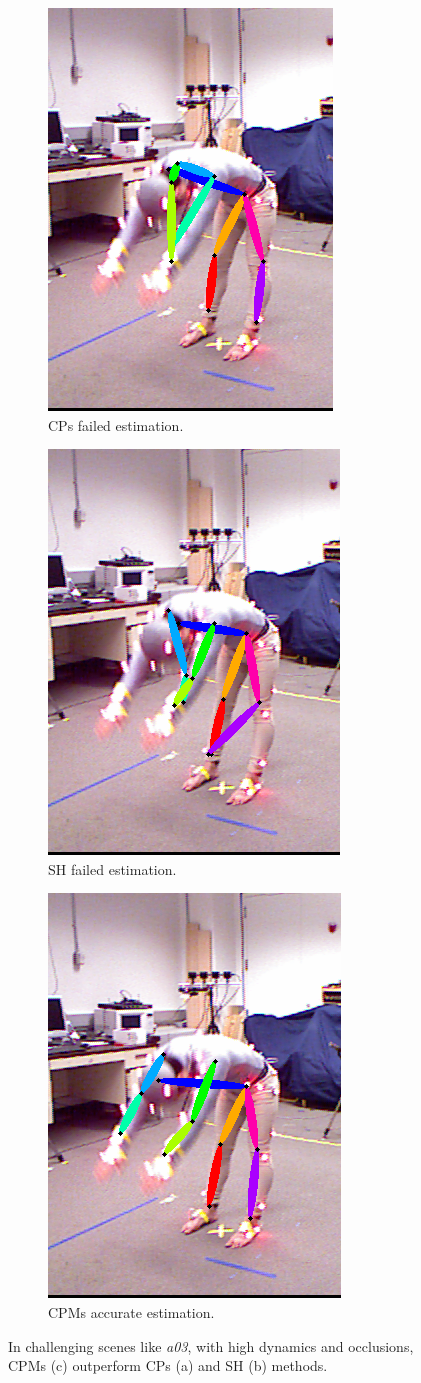 \begin{figure}[h]\centering
    \begin{subfigure}{0.32\textwidth}\centering
        \includegraphics[height=7.cm]{figures/chained_failed.png} 
        \caption{CPs failed estimation.}
        \label{subfig:chained_failed}
    \end{subfigure}
    \begin{subfigure}{0.32\textwidth}\centering
        \includegraphics[height=7.cm]{figures/stacked_failed.png}
        \caption{SH failed estimation.}
        \label{subfig:stacked_failed}
    \end{subfigure}
    \begin{subfigure}{0.32\textwidth}\centering
        \includegraphics[height=7.cm]{figures/cpm_right.png}
        \caption{CPMs accurate estimation.}
        \label{subfig:cpm_right}
    \end{subfigure}
    \caption{In challenging scenes like \textit{a03}, with high dynamics and occlusions, CPMs (c) outperform CPs (a) and SH (b) methods. }
    \label{fig:2d_comparison}
\end{figure}

